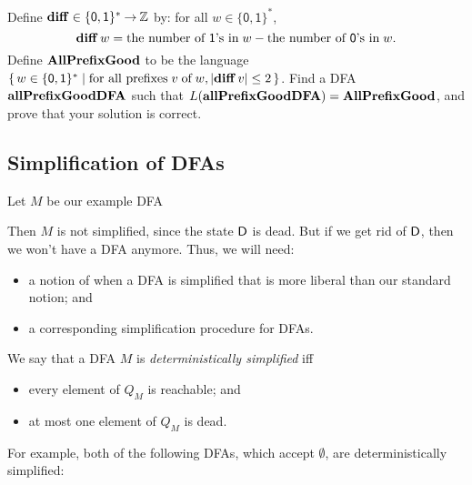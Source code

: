 \begin{exercise}
\label{AllGoodDFACorrLem}
Define $\mathbf{diff}\in\{\mathsf{0,1}\}^*\mathbin{\to}\mathbb{Z}$ by:
%
%
%
%
for all $w\in\{\mathsf{0,1}\}^*$,
\begin{displaymath}
\mathbf{diff}\,w =
\allowbreak\mbox{the number of $\mathsf{1}$'s in}\allowbreak\;w -
\allowbreak\mbox{the number of $\mathsf{0}$'s in}\allowbreak\;w .
\end{displaymath}
Define $\mathbf{AllPrefixGood}$ to be the language
$\{ \, w\in\{\mathsf{0,1}\}^* \mid \allowbreak\mbox{for all prefixes}\allowbreak\; v\;\allowbreak\mbox{of}\allowbreak\;
  w, |\mathbf{diff}\,v|\leq 2 \, \}$.  Find a DFA $\mathbf{allPrefixGoodDFA}$ such that
$L(\mathbf{allPrefixGoodDFA}) = \mathbf{AllPrefixGood}$, and prove that your solution
is correct.
\end{exercise}

\subsection{Simplification of DFAs}

%
%
Let $M$ be our example DFA
\begin{center}

\end{center}
Then $M$ is not simplified, since the state $\mathsf{D}$ is dead.  But if we
get rid of $\mathsf{D}$, then we won't have a DFA anymore.  Thus, we will
need:
\begin{itemize}
\item a notion of when a DFA is simplified that is more liberal than
  our standard notion; and

\item a corresponding simplification procedure for DFAs.
\end{itemize}
%
%
We say that a DFA $M$ is \emph{deterministically simplified} iff
\begin{itemize}
\item every element of $Q_M$ is reachable; and

\item at most one element of $Q_M$ is dead.
\end{itemize}
For example, both of the following DFAs, which accept $\emptyset$,
are deterministically simplified:
\begin{center}

\end{center}

